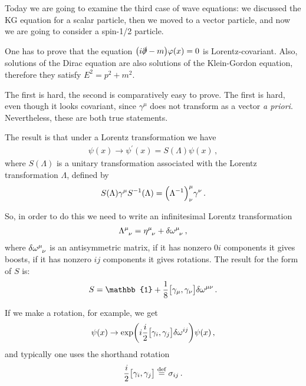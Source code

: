 \documentclass[main.tex]{subfiles}
\begin{document}

Today we are going to examine the third case of wave equations: we discussed the KG equation for a scalar particle, then we moved to a vector particle, and now we are going to consider a spin-1/2 particle. 


One has to prove that the equation \(\qty(i \slashed{\partial} - m)  \varphi (x )=0\) is Lorentz-covariant. 
Also, solutions of the Dirac equation are also solutions of the Klein-Gordon equation, therefore they satisfy \(E^2=p^2+m^2\). 

The first is hard, the second is comparatively easy to prove. 
The first is hard, even though it looks covariant, since \(\gamma^{\mu }\) does not transform as a vector \emph{a priori}. 
Nevertheless, these are both true statements. 

The result is that under a Lorentz transformation we have 
%
\begin{align}
\psi (x) \rightarrow \psi^{\prime } (x) = S(\Lambda ) \psi (x)
\,,
\end{align}
%
where \(S(\Lambda )\) is a unitary transformation associated with the Lorentz transformation \(\Lambda \), defined by 
%
\begin{align}
S (\Lambda ) \gamma^{\mu } S^{-1} (\Lambda ) = \qty(\Lambda^{-1})^{\mu }_{\nu } \gamma^{\nu }
\,.
\end{align}

So, in order to do this we need to write an infinitesimal Lorentz transformation 
%
\begin{align}
\tensor{\Lambda }{^{\mu }_{\nu }} = \tensor{\eta }{^{\mu }_{\nu }} + \delta \tensor{\omega}{^{\mu }_{\nu }}
\,,
\end{align}
%
where \(\delta \tensor{\omega }{^{\mu }_{\nu }}\) is an antisymmetric matrix, if it has nonzero \(0i\) components it gives boosts, if it has nonzero \(ij\) components it gives rotations. 
The result for the form of \(S\) is:
%
\begin{align}
S = \mathbb{1} + \frac{1}{8 } \qty[\gamma_{\mu }, \gamma_{\nu }] \delta \tensor{\omega }{^{\mu \nu }}
\,.
\end{align}

If we make a rotation, for example, we get 
%
\begin{align}
\psi (x) \rightarrow \exp(i \frac{i}{2} \qty[\gamma_{i}, \gamma_{j}] \delta \tensor{\omega }{^{ij}}) \psi (x) 
\,,
\end{align}
%
and typically one uses the shorthand rotation 
%
\begin{align}
\frac{i}{2} \qty[\gamma_{i}, \gamma_{j}] \overset{\text{def}}{=} \sigma_{ij}
\,.
\end{align}
\end{document}
